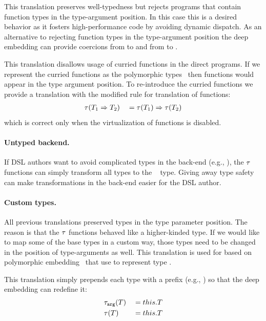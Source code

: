 This translation preserves well-typedness but rejects programs that contain
function types in the type-argument position. In this case this is a desired
behavior as it fosters high-performance code by avoiding dynamic dispatch. As an alternative to rejecting function types in the type-argument position the deep embedding can provide
coercions from  to  and from  to .

This translation disallows usage of curried functions in the direct programs. If we
represent the curried functions as the polymorphic types~ then
functions would appear in the type argument position. To re-introduce the curried functions we
provide a translation with the modified rule for translation of functions:
\begin{alignat*}{3}
&\ttother[T_1 \Rightarrow T_2] & \; = \; & \ttother[T_1] \Rightarrow \ttother[T_2]\\
\end{alignat*} %
which is correct only when the virtualization of functions is disabled.

\paragraph{Untyped backend.} If DSL authors want to avoid complicated types in the back-end (e.g., ), the $\tau$ functions can simply transform all types to the ~\cite{abadi_dynamic_1991} type. Giving away type safety can make transformations in the back-end easier for the DSL author.

\paragraph{Custom types.} All previous translations preserved types in the type parameter position. The reason is that the $\tau$ functions behaved like a higher-kinded type. If we would like to map some of the base types in a custom way, those types need to be changed in the position of type-arguments as well. This translation is used for \edsls based on polymorphic embedding~\cite{hofer_polymorphic_2008} that use  to represent type .

This translation simply prepends each type with a prefix (e.g., ) so that
the deep embedding can redefine it:
\begin{alignat*}{3}
&\ttarg[T] & \; = \; & this.T\\
&\ttother[T] & \; = \; & this.T\\
\end{alignat*}

